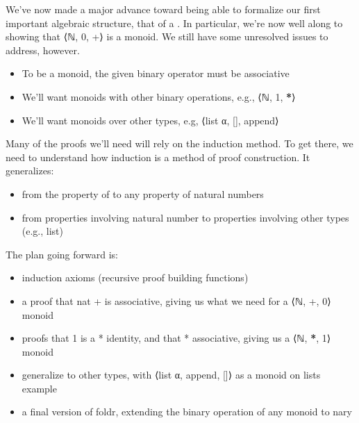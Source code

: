 \documentclass[letterpaper,10pt,english]{sphinxmanual}
\begin{document}
\sphinxAtStartPar
We’ve now made a major advance toward being able to formalize
our first important algebraic structure, that of a .
In particular, we’re now well along to showing that ⟨ℕ, 0, +⟩
is a monoid. We still have some unresolved issues to address,
however.
\begin{itemize}
\item {} 
\sphinxAtStartPar
To be a monoid, the given binary operator must be associative

\item {} 
\sphinxAtStartPar
We’ll want monoids with other binary operations, e.g., ⟨ℕ, 1, {\color{red}\bfseries{}*}⟩

\item {} 
\sphinxAtStartPar
We’ll want monoids over other types, e.g, ⟨list α, {[}{]}, append⟩

\end{itemize}

\sphinxAtStartPar
Many of the proofs we’ll need will rely on the induction method.
To get there, we need to understand how induction is a 
method of proof construction. It generalizes:
\begin{itemize}
\item {} 
\sphinxAtStartPar
from the property of  to any property of natural numbers

\item {} 
\sphinxAtStartPar
from properties involving natural number to properties involving other types (e.g., list)

\end{itemize}

\sphinxAtStartPar
The plan going forward is:
\begin{itemize}
\item {} 
\sphinxAtStartPar
induction axioms (recursive proof building functions) 

\item {} 
\sphinxAtStartPar
a proof that nat + is associative, giving us what we need for a ⟨ℕ, +, 0⟩ monoid

\item {} 
\sphinxAtStartPar
proofs that 1 is a * identity, and that * associative, giving us a ⟨ℕ, {\color{red}\bfseries{}*}, 1⟩ monoid

\item {} 
\sphinxAtStartPar
generalize to other types, with ⟨list α, append, {[}{]}⟩ as a monoid on lists example

\item {} 
\sphinxAtStartPar
a final version of foldr, extending the binary operation of any monoid to n\sphinxhyphen{}ary

\end{itemize}
\end{document}
